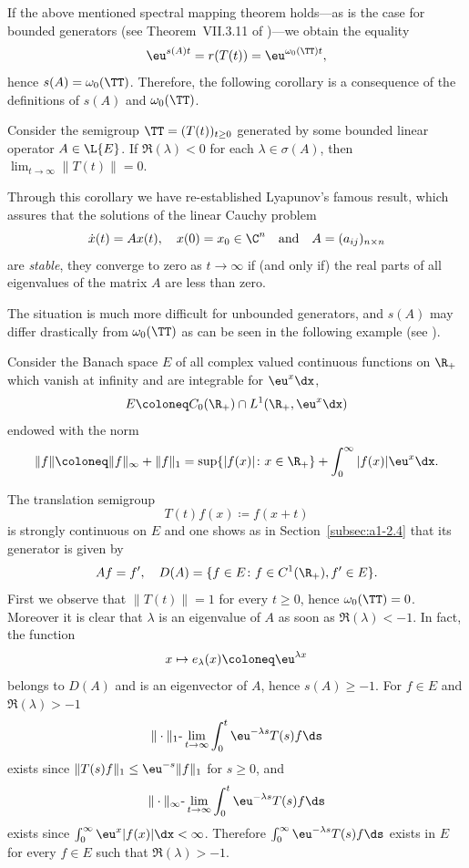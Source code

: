 If the above mentioned spectral mapping theorem holds---as is the case for bounded generators (\eg see Theorem~VII.3.11 of \textcite{dunfordschwartz:1958})---we obtain the equality
\[
    \eu^{s(A)t} = r(T(t)) = \eu^{\omega_{0}(\TT) t} ,
\]
hence $s(A) = \omega_{0}(\TT)$.
Therefore, the following corollary is a consequence of the definitions of\/ $s(A)$ and $\omega_{0}(\TT)$.
\begin{corollary}\label{cor:a3-1.2}
Consider the semigroup $\TT = (T(t))_{t \geq 0}$ generated by some bounded linear operator $A \in \L{E}$.
If\/ $\Re(\lambda) < 0$ for each $\lambda \in \sigma(A)$, then 
\mbox{$\lim_{t \to \infty}\|T(t)\| = 0$.}
\end{corollary}
Through this corollary we have re-established Lyapunov's  famous result, which assures that the solutions of the linear Cauchy problem
\[
    \dot{x}(t) = Ax(t), \quad x(0) = x_{0} \in \C^{n} \quad \text{and} \quad A = (a_{ij})_{n\times n}
\]
are \emph{stable}, \ie they converge to zero as $t \to \infty$ if (and only if) the real parts of all eigenvalues of the matrix $A$ are less than zero.

The situation is much more difficult for unbounded generators, and $s(A)$ may differ drastically from $\omega_{0}(\TT)$ as can be seen in the following example (see \textcite{greinervoigtwolff:1981}).
\begin{example}\label{ex:a3-1.3}
Consider the Banach space $E$ of all complex valued continuous functions on $\R_{+}$ which vanish at infinity and are integrable for $\eu^{x}\dx$, \ie 
\[
    E \coloneq C_{0}(\R_{+}) \cap L^{1}(\R_{+}, \eu^{x}\dx)
\]
endowed with the norm
\[
    \|f\| \coloneq \|f\|_{\infty} + \|f\|_{1} = \sup\{|f(x)| \colon x \in \R_{+}\} + \int_{0}^{\infty} |f(x)|\eu^{x} \dx .
\]
\end{example}
The translation semigroup
\[
    T(t)f(x) \coloneq f(x+t)
\]
is strongly continuous on $E$ and one shows as in Section~\ref{subsec:a1-2.4} that its generator is given by
\[
    Af = f', \quad D(A) = \{ f \in E \colon f \in C^{1}(\R_{+}), f' \in E \} .
\]
First we observe that $\|T(t)\| = 1$ for every $t \geq 0$, hence $\omega_{0}(\TT) = 0$.
Moreover it is clear that $\lambda$ is an eigenvalue of\/ $A$ as soon as $\Re(\lambda) < -1$. In fact, the function
\[
    x \mapsto e_{\lambda}(x) \coloneq \eu^{\lambda x}
\]
belongs to $D(A)$ and is an eigenvector of\/ $A$, hence $s(A) \geq -1$.
For $f \in E$ and $\Re(\lambda) > -1$ 
\[
    \|\cdot\|_{1}\text{-}\lim_{t \to \infty} \int_{0}^{t} \eu^{-\lambda s}T(s)f \ds
\]
exists since $\|T(s)f\|_{1} \leq \eu^{-s}\|f\|_{1}$ for $s \geq 0$, and
\[
    \|\cdot\|_{\infty}\text{-}\lim_{t \to \infty} \int_{0}^{t} \eu^{-\lambda s}T(s)f \ds
\]
exists since $\int_{0}^{\infty} \eu^{x}|f(x)| \dx < \infty$.
Therefore $\int_{0}^{\infty} \eu^{-\lambda s}T(s)f \ds$ exists in $E$ for every $f \in E$ such that $\Re(\lambda) > -1$.

